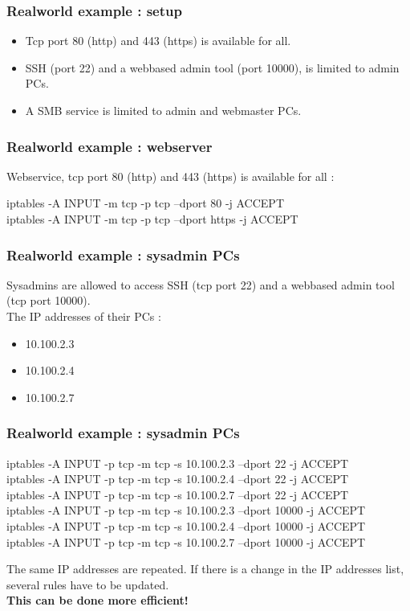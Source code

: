 \documentclass[14pt]{beamer}
\begin{document}
  \begin{frame}
    \frametitle{Realworld example : setup}
    \begin{itemize}
      \item Tcp port 80 (http) and 443 (https) is available for all.
      \item SSH (port 22) and a webbased admin tool (port 10000), is limited to admin PCs.
      \item A SMB service is limited to admin and webmaster PCs.
    \end{itemize}
  \end{frame}
  \begin{frame}
    \frametitle{Realworld example : webserver}
    Webservice, tcp port 80 (http) and 443 (https) is available for all :
    \begin{example}
      \small{iptables -A INPUT -m tcp -p tcp --dport 80 -j ACCEPT\\
      iptables -A INPUT -m tcp -p tcp --dport https -j ACCEPT}
    \end{example}
  \end{frame}
  \begin{frame}
    \frametitle{Realworld example : sysadmin PCs}
    Sysadmins are allowed to access SSH (tcp port 22) and a webbased admin tool (tcp port 10000).\\
    The IP addresses of their PCs :
    \begin{itemize}
	\item 10.100.2.3
	\item 10.100.2.4
	\item 10.100.2.7
    \end{itemize}
  \end{frame}
  \begin{frame}
    \frametitle{Realworld example : sysadmin PCs}
    \begin{example}
      \small{iptables -A INPUT -p tcp -m tcp -s 10.100.2.3 --dport 22 -j ACCEPT\\
      iptables -A INPUT -p tcp -m tcp -s 10.100.2.4 --dport 22 -j ACCEPT\\
      iptables -A INPUT -p tcp -m tcp -s 10.100.2.7 --dport 22 -j ACCEPT\\
      iptables -A INPUT -p tcp -m tcp -s 10.100.2.3 --dport 10000 -j ACCEPT\\
      iptables -A INPUT -p tcp -m tcp -s 10.100.2.4 --dport 10000 -j ACCEPT\\
      iptables -A INPUT -p tcp -m tcp -s 10.100.2.7 --dport 10000 -j ACCEPT}
    \end{example}
    \pause
    The same IP addresses are repeated. If there is a change in the IP addresses list, several rules have to be updated.\\
    \pause
    \textbf{This can be done more efficient!}
  \end{frame}
\end{document}
